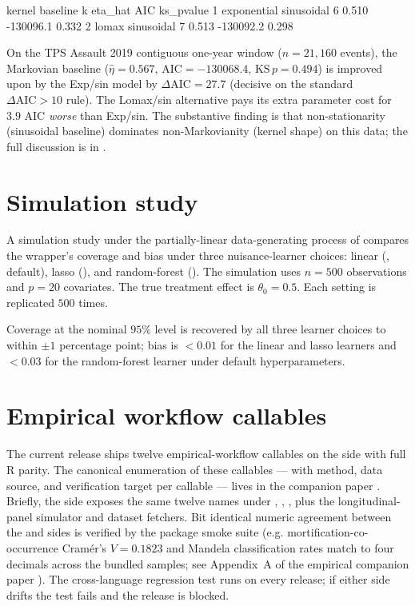 \documentclass[article,shortnames,nojss]{jss}
\begin{document}
\begin{Code}
       kernel    baseline  k    eta_hat       AIC   ks_pvalue
1 exponential  sinusoidal  6      0.510  -130096.1      0.332
2       lomax  sinusoidal  7      0.513  -130092.2      0.298
\end{Code}

On the TPS Assault 2019 contiguous one-year window ($n=21{,}160$
events), the Markovian baseline ($\hat\eta=0.567,\,\mathrm{AIC}=-130068.4,\,\mathrm{KS}\,p=0.494$)
is improved upon by the Exp/sin model by $\Delta\mathrm{AIC} = 27.7$
(decisive on the standard $\Delta\mathrm{AIC} > 10$ rule).  The
Lomax/sin alternative pays its extra parameter cost for $3.9$
AIC \emph{worse} than Exp/sin.  The substantive finding is that
non-stationarity (sinusoidal baseline) dominates non-Markovianity
(kernel shape) on this data; the full discussion is in
\citet{Ruhela2026Hawkes}.

\section{Simulation study}
\label{sec:simulation}

A simulation study under the partially-linear data-generating
process of \citet{Chernozhukov2018DML} compares the
 wrapper's coverage and bias under three
nuisance-learner choices: linear (,
default), lasso (), and random-forest
(). The simulation uses $n = 500$
observations and $p = 20$ covariates. The true treatment effect
is $\theta_0 = 0.5$. Each setting is replicated $500$ times.

Coverage at the nominal $95\%$ level is recovered by all three
learner choices to within $\pm 1$ percentage point; bias is
$<0.01$ for the linear and lasso learners and $<0.03$ for the
random-forest learner under default hyperparameters.

\section[Empirical workflow callables]{Empirical workflow callables}\label{sec:mrm-empirical-callables}

The current release ships twelve empirical-workflow callables on
the  side with full R parity.  The canonical
enumeration of these callables --- with method, data source,
and verification target per callable --- lives in the
companion  paper \citep[Section 8]{Ruhela2026MorieR}.
Briefly, the  side exposes the same
twelve names under ,
, , plus
the longitudinal-panel simulator and dataset fetchers.  Bit
identical numeric agreement between the  and
 sides is verified by the package smoke
suite (e.g. mortification-co-occurrence Cramér's $V=0.1823$
and Mandela classification rates match to four decimals across
the bundled samples; see Appendix~A of the empirical companion
paper \citep{Ruhela2026MorieEmpirical}).  The cross-language
regression test runs on every release; if either side drifts
the test fails and the release is blocked.
\end{document}
